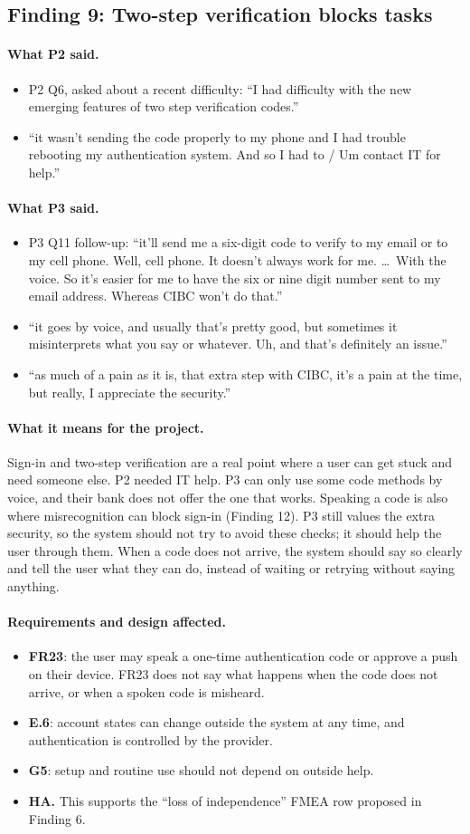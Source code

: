 \documentclass[12pt, titlepage]{article}
\newcommand{\saidtwo}{\paragraph{What P2 said.}}
\newcommand{\saidthree}{\paragraph{What P3 said.}}
\newcommand{\means}{\paragraph{What it means for the project.}}
\newcommand{\affects}{\paragraph{Requirements and design affected.}}
\begin{document}
\subsection{Finding 9: Two-step verification blocks tasks}

\saidtwo
\begin{itemize}
    \item P2 Q6, asked about a recent difficulty: ``I had difficulty with the new emerging features of two step verification codes.''
    \item ``it wasn't sending the code properly to my phone and I had trouble rebooting my authentication system. And so I had to / Um contact IT for help.''
\end{itemize}

\saidthree
\begin{itemize}
    \item P3 Q11 follow-up: ``it'll send me a six-digit code to verify to my email or to my cell phone. Well, cell phone. It doesn't always work for me. \ldots\ With the voice. So it's easier for me to have the six or nine digit number sent to my email address. Whereas CIBC won't do that.''
    \item ``it goes by voice, and usually that's pretty good, but sometimes it misinterprets what you say or whatever. Uh, and that's definitely an issue.''
    \item ``as much of a pain as it is, that extra step with CIBC, it's a pain at the time, but really, I appreciate the security.''
\end{itemize}

\means
Sign-in and two-step verification are a real point where a user can get stuck and need someone else. P2 needed IT help. P3 can only use some code methods by voice, and their bank does not offer the one that works. Speaking a code is also where misrecognition can block sign-in (Finding 12). P3 still values the extra security, so the system should not try to avoid these checks; it should help the user through them. When a code does not arrive, the system should say so clearly and tell the user what they can do, instead of waiting or retrying without saying anything.

\affects
\begin{itemize}
    \item \textbf{FR23}: the user may speak a one-time authentication code or approve a push on their device. FR23 does not say what happens when the code does not arrive, or when a spoken code is misheard.
    \item \textbf{E.6}: account states can change outside the system at any time, and authentication is controlled by the provider.
    \item \textbf{G5}: setup and routine use should not depend on outside help.
    \item \textbf{HA.} This supports the ``loss of independence'' FMEA row proposed in Finding 6.
\end{itemize}
\end{document}
